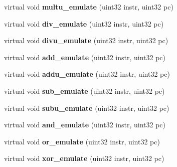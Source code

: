 \begin{DoxyCompactItemize}
\item 
\hypertarget{classCPU_af8628854d517536beef3881efe38fd49}{
virtual void {\bfseries multu\_\-emulate} (uint32 instr, uint32 pc)}
\label{classCPU_af8628854d517536beef3881efe38fd49}

\item 
\hypertarget{classCPU_ab95168699ff1d7584235ee5c809f44b1}{
virtual void {\bfseries div\_\-emulate} (uint32 instr, uint32 pc)}
\label{classCPU_ab95168699ff1d7584235ee5c809f44b1}

\item 
\hypertarget{classCPU_a2b590f2e5e763f6da34d0fcea9e7c8f9}{
virtual void {\bfseries divu\_\-emulate} (uint32 instr, uint32 pc)}
\label{classCPU_a2b590f2e5e763f6da34d0fcea9e7c8f9}

\item 
\hypertarget{classCPU_ad0484160ae69b0ac2846b1b3b0b1999c}{
virtual void {\bfseries add\_\-emulate} (uint32 instr, uint32 pc)}
\label{classCPU_ad0484160ae69b0ac2846b1b3b0b1999c}

\item 
\hypertarget{classCPU_ab3e34c227c2b9fdedb4864bff4b74b58}{
virtual void {\bfseries addu\_\-emulate} (uint32 instr, uint32 pc)}
\label{classCPU_ab3e34c227c2b9fdedb4864bff4b74b58}

\item 
\hypertarget{classCPU_a2068ff82e63f8cc9d1c592bf43beb136}{
virtual void {\bfseries sub\_\-emulate} (uint32 instr, uint32 pc)}
\label{classCPU_a2068ff82e63f8cc9d1c592bf43beb136}

\item 
\hypertarget{classCPU_a021ea426761c59fa7ffcfbcd4e66a645}{
virtual void {\bfseries subu\_\-emulate} (uint32 instr, uint32 pc)}
\label{classCPU_a021ea426761c59fa7ffcfbcd4e66a645}

\item 
\hypertarget{classCPU_a692f230fa6a061aea3c841c7370f6d1c}{
virtual void {\bfseries and\_\-emulate} (uint32 instr, uint32 pc)}
\label{classCPU_a692f230fa6a061aea3c841c7370f6d1c}

\item 
\hypertarget{classCPU_aafea7d93d1b958836509d66dd0e7076a}{
virtual void {\bfseries or\_\-emulate} (uint32 instr, uint32 pc)}
\label{classCPU_aafea7d93d1b958836509d66dd0e7076a}

\item 
\hypertarget{classCPU_a1ba85e418ee61a271a9aafbfde3351d7}{
virtual void {\bfseries xor\_\-emulate} (uint32 instr, uint32 pc)}
\label{classCPU_a1ba85e418ee61a271a9aafbfde3351d7}


\end{DoxyCompactItemize}

